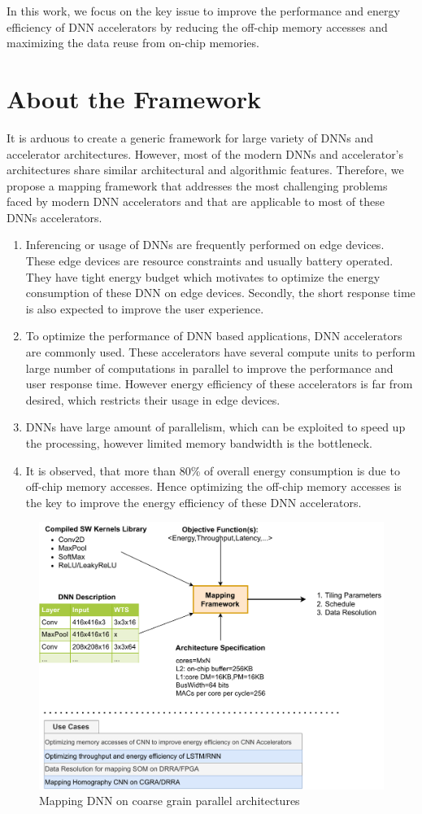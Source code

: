 \documentclass[a4paper,10pt]{article}
\begin{document}
In this work, we focus on the key issue to improve the performance and energy efficiency of DNN accelerators by reducing the off-chip memory accesses and maximizing the data reuse from on-chip memories.

\section{About the Framework}
It is arduous to create a generic framework for large variety of DNNs and accelerator architectures. However, most of the modern DNNs and accelerator's architectures share similar architectural and algorithmic features. Therefore, we propose a mapping framework that addresses the most challenging problems faced by modern DNN accelerators and that are applicable to most of these DNNs accelerators.
\begin{enumerate}
	\item Inferencing or usage of DNNs are frequently performed on edge devices. These edge devices  are resource constraints and usually battery operated. They have tight energy budget which motivates to optimize the energy consumption of these DNN on edge devices. Secondly, the short response time is also expected to improve the user experience.
   \item To optimize the performance of DNN based applications, DNN accelerators are commonly used. These accelerators have several compute units to perform large number of computations in parallel to improve the performance and user response time. However energy efficiency of these accelerators is far from desired, which restricts their usage in edge devices.
   \item DNNs have large amount of parallelism, which can be exploited to speed up the processing, however limited memory bandwidth is the bottleneck. 
   \item It is observed, that more than 80\% of overall energy consumption is due to off-chip memory accesses. Hence optimizing the off-chip memory accesses is the key to improve the energy efficiency of these DNN accelerators.
\end{enumerate}
\begin{figure}[ht]
	\centering
	\includegraphics[width=0.7\linewidth]{./images/blockDiagram}
	\caption{Mapping DNN on coarse grain parallel architectures}
	\label{fig:introduction}
\end{figure}
\end{document}
